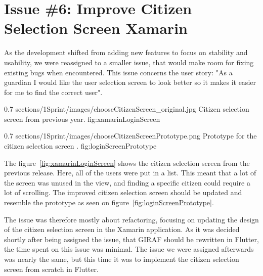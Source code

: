 \section{Issue \#6: Improve Citizen Selection Screen Xamarin}
\label{sect:chooseCitizenXamarin}
As the development shifted from adding new features to focus on stability and usability, we were reassigned to a smaller issue, that would make room for fixing existing bugs when encountered.
This issue concerns the user story: "As a guardian I would like the user selection screen to look better so it makes it easier for me to find the correct user".

        {0.7} %
        {sections/1Sprint/images/chooseCitizenScreen_original.jpg} %
        {Citizen selection screen from previous year.} %
        {fig:xamarinLoginScreen} %
        
        {0.7} %
        {sections/1Sprint/images/chooseCitizenScreenPrototype.png} %
        {Prototype for the citizen selection screen \citep{cite:chooseCitizenPrototypeGitHub}.} %
        {fig:loginScreenPrototype} %

The figure~\ref{fig:xamarinLoginScreen} shows the citizen selection screen from the previous release. Here, all of the users were put in a list. This meant that a lot of the screen was unused in the view, and finding a specific citizen could require a lot of scrolling.
The improved citizen selection screen should be updated and resemble the prototype as seen on figure~\ref{fig:loginScreenPrototype}.

The issue was therefore mostly about refactoring, focusing on updating the design of the citizen selection screen in the Xamarin application. As it was decided shortly after being assigned the issue, that GIRAF should be rewritten in Flutter, the time spent on this issue was minimal. The issue we were assigned afterwards was nearly the same, but this time it was to implement the citizen selection screen from scratch in Flutter. 